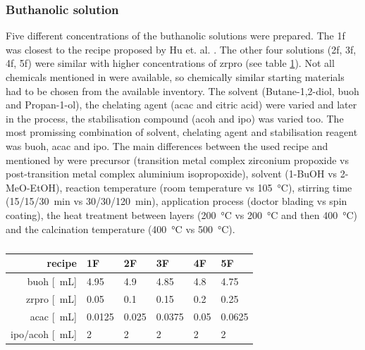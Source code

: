 \documentclass[a4paper]{article}
\newcommand{\td}[1]{\textcolor{red}{#1}}
\newcommand{\ml}[1]{\SI{#1}{\milli\liter}}
\begin{document}
\subsubsection{Buthanolic solution}
\label{sec:sol}
Five different concentrations of the buthanolic solutions were prepared. 
The \gls{1f} was closest to the recipe proposed by Hu et. al. \cite{Hu2016}. 
The other four solutions (\gls{2f}, \gls{3f}, \gls{4f}, \gls{5f}) were similar with 
higher concentrations of \gls{zrpro} (see table \ref{tab:rec2}).
Not all chemicals mentioned in \cite{Hu2016} were available, so chemically similar 
starting materials had to be chosen from the available inventory. 
The solvent (Butane-1,2-diol, \gls{buoh} and Propan-1-ol), the chelating agent 
(\gls{acac} and citric acid) were varied and later in the process, the stabilisation 
compound (\gls{acoh} and \gls{ipo}) was varied too.
The most promissing combination of solvent, chelating agent and stabilisation reagent was \gls{buoh}, \gls{acac} and \gls{ipo}.
The main differences between the used recipe and mentioned by \cite{Hu2016} were 
precursor (transition metal complex zirconium propoxide \gls{vs} post-transition metal 
complex aluminium isopropoxide), solvent (1-BuOH \gls{vs} 2-MeO-EtOH), reaction temperature 
(room temperature \gls{vs} \SI{105}{\celsius}), stirring time (15/15/\SI{30}{\minute}
\gls{vs} 30/30/\SI{120}{\minute}), application process (doctor blading \gls{vs} spin coating), 
the heat treatment between layers (\SI{200}{\celsius} \gls{vs} \SI{200}{\celsius} and then \SI{400}
{\celsius}) and the calcination temperature (\SI{400}{\celsius} \gls{vs}
\SI{500}{\celsius}).

\begin{table}[h]
	\centering
	\caption{}
	\label{tab:rec2}
	\begin{tabular}{rlllll}
		\hline
		recipe	&1F		&2F		&3F		&4F		&5F		\\
		\hline
		\gls{buoh} [\ml{}]		&4.95	&4.9	&4.85	&4.8	&4.75	\\
		\gls{zrpro} [\ml{}]	&0.05	&0.1	&0.15	&0.2	&0.25	\\
		\gls{acac} [\ml{}]		&0.0125	&0.025	&0.0375	&0.05	&0.0625	\\
		\gls{ipo}/\gls{acoh} [\ml{}]		&2		&2		&2		&2		&2		\\
		\hline
	\end{tabular}
\end{table}
\end{document}
